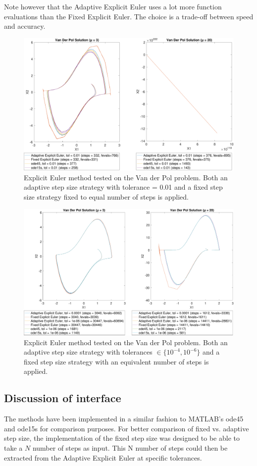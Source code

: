 Note however that the Adaptive Explicit Euler uses a lot more function evaluations than the Fixed Explicit Euler. The choice is a trade-off between speed and accuracy.

\begin{figure}
    \centering
    \includegraphics[width=\textwidth]{plots/2_4main_02.pdf}
    \caption{Explicit Euler method tested on the Van der Pol problem. Both an adaptive step size strategy with tolerance = 0.01 and a fixed step size strategy fixed to equal number of steps is applied.}
    \label{fig:2_4a}
\end{figure}

\begin{figure}
    \centering
    \includegraphics[width=\textwidth]{plots/2_4main_04_06.pdf}
    \caption{Explicit Euler method tested on the Van der Pol problem. Both an adaptive step size strategy with tolerances $\in \{10^{-4}, 10^{-6}\}$ and a fixed step size strategy with an equivalent number of steps is applied.}
    \label{fig:2_4b}
\end{figure}

\subsection{Discussion of interface}
The methods have been implemented in a similar fashion to MATLAB's ode45 and ode15s for comparison purposes. For better comparison of fixed vs. adaptive step size, the implementation of the fixed step size was designed to be able to take a $N$ number of steps as input. This N number of steps could then be extracted from the Adaptive Explicit Euler at specific tolerances.